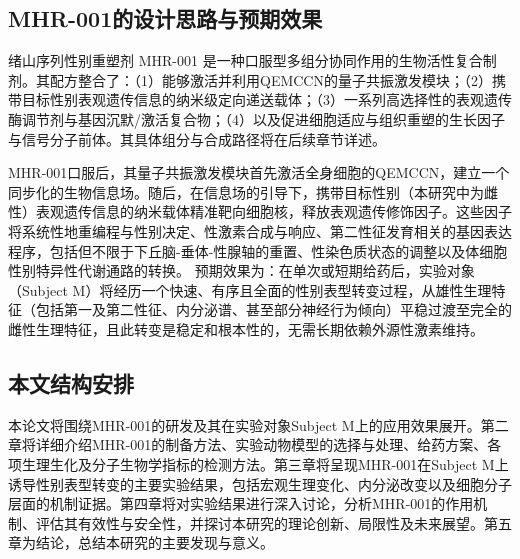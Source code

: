 \subsection{MHR-001的设计思路与预期效果}

绪山序列性别重塑剂 MHR-001 是一种口服型多组分协同作用的生物活性复合制剂。其配方整合了：（1）能够激活并利用QEMCCN的量子共振激发模块；（2）携带目标性别表观遗传信息的纳米级定向递送载体；（3）一系列高选择性的表观遗传酶调节剂与基因沉默/激活复合物；（4）以及促进细胞适应与组织重塑的生长因子与信号分子前体。其具体组分与合成路径将在后续章节详述。

MHR-001口服后，其量子共振激发模块首先激活全身细胞的QEMCCN，建立一个同步化的生物信息场。随后，在信息场的引导下，携带目标性别（本研究中为雌性）表观遗传信息的纳米载体精准靶向细胞核，释放表观遗传修饰因子。这些因子将系统性地重编程与性别决定、性激素合成与响应、第二性征发育相关的基因表达程序，包括但不限于下丘脑-垂体-性腺轴的重置、性染色质状态的调整以及体细胞性别特异性代谢通路的转换。
预期效果为：在单次或短期给药后，实验对象（Subject M）将经历一个快速、有序且全面的性别表型转变过程，从雄性生理特征（包括第一及第二性征、内分泌谱、甚至部分神经行为倾向）平稳过渡至完全的雌性生理特征，且此转变是稳定和根本性的，无需长期依赖外源性激素维持。

\subsection{本文结构安排}

本论文将围绕MHR-001的研发及其在实验对象Subject M上的应用效果展开。第二章将详细介绍MHR-001的制备方法、实验动物模型的选择与处理、给药方案、各项生理生化及分子生物学指标的检测方法。第三章将呈现MHR-001在Subject M上诱导性别表型转变的主要实验结果，包括宏观生理变化、内分泌改变以及细胞分子层面的机制证据。第四章将对实验结果进行深入讨论，分析MHR-001的作用机制、评估其有效性与安全性，并探讨本研究的理论创新、局限性及未来展望。第五章为结论，总结本研究的主要发现与意义。